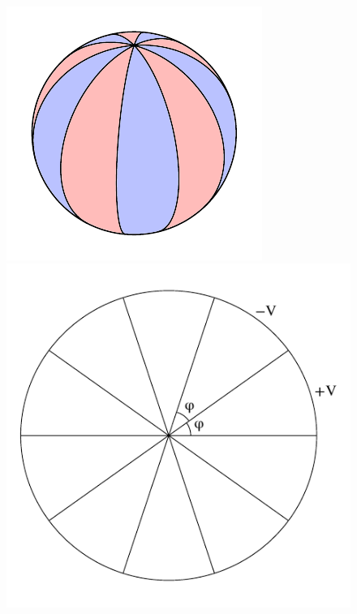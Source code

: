 \hrulefill\\
\afterpage{\clearpage}
\begin{figure} 
  \centering
  \includegraphics[width=\linewidth]{fig/Jackson3-4_1.pdf}\\
  \includegraphics[width=\linewidth]{fig/Jackson3-4_2.pdf}
\end{figure}%
